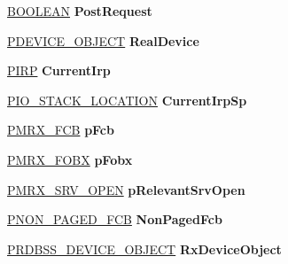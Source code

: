 \begin{DoxyCompactItemize}
\hyperlink{_processor_bind_8h_a112e3146cb38b6ee95e64d85842e380a}{B\+O\+O\+L\+E\+AN} {\bfseries Post\+Request}
\item 
\mbox{\label{struct___r_x___c_o_n_t_e_x_t_ad8244de85a99fab960140ff56cfc849c}} 
\hyperlink{struct___d_e_v_i_c_e___o_b_j_e_c_t}{P\+D\+E\+V\+I\+C\+E\+\_\+\+O\+B\+J\+E\+CT} {\bfseries Real\+Device}
\item 
\mbox{\label{struct___r_x___c_o_n_t_e_x_t_a466c0c8584632244194ee7c772c3665a}} 
\hyperlink{interfacevoid}{P\+I\+RP} {\bfseries Current\+Irp}
\item 
\mbox{\label{struct___r_x___c_o_n_t_e_x_t_a9b6292d3f117c3225588e0d12dcb5413}} 
\hyperlink{struct___i_o___s_t_a_c_k___l_o_c_a_t_i_o_n}{P\+I\+O\+\_\+\+S\+T\+A\+C\+K\+\_\+\+L\+O\+C\+A\+T\+I\+ON} {\bfseries Current\+Irp\+Sp}
\item 
\mbox{\label{struct___r_x___c_o_n_t_e_x_t_aed0582918f5f1ff0d9c0b6a08d859f0b}} 
\hyperlink{struct___m_r_x___f_c_b__}{P\+M\+R\+X\+\_\+\+F\+CB} {\bfseries p\+Fcb}
\item 
\mbox{\label{struct___r_x___c_o_n_t_e_x_t_a7f791cd82dce516455aa5eebbf284a6f}} 
\hyperlink{struct___m_r_x___f_o_b_x__}{P\+M\+R\+X\+\_\+\+F\+O\+BX} {\bfseries p\+Fobx}
\item 
\mbox{\label{struct___r_x___c_o_n_t_e_x_t_acf37aa96e26200257418b80f48e4c1dd}} 
\hyperlink{struct___m_r_x___s_r_v___o_p_e_n__}{P\+M\+R\+X\+\_\+\+S\+R\+V\+\_\+\+O\+P\+EN} {\bfseries p\+Relevant\+Srv\+Open}
\item 
\mbox{\label{struct___r_x___c_o_n_t_e_x_t_a6b7b1137dbaee025f31b9dd42a6d0ff3}} 
\hyperlink{struct___n_o_n___p_a_g_e_d___f_c_b}{P\+N\+O\+N\+\_\+\+P\+A\+G\+E\+D\+\_\+\+F\+CB} {\bfseries Non\+Paged\+Fcb}
\item 
\mbox{\label{struct___r_x___c_o_n_t_e_x_t_ab402b6e14d86b94f58e32ae3d37f8c75}} 
\hyperlink{struct___r_d_b_s_s___d_e_v_i_c_e___o_b_j_e_c_t}{P\+R\+D\+B\+S\+S\+\_\+\+D\+E\+V\+I\+C\+E\+\_\+\+O\+B\+J\+E\+CT} {\bfseries Rx\+Device\+Object}

\end{DoxyCompactItemize}

